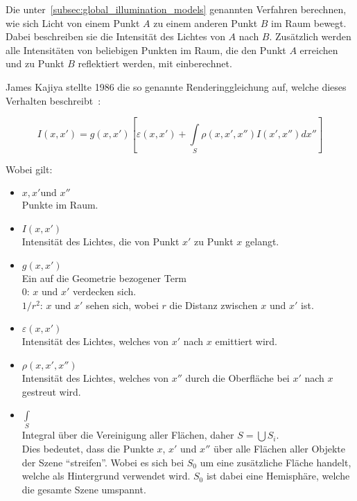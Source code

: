 Die unter~\ref{subsec:global_illumination_models} genannten Verfahren
berechnen, wie sich Licht von einem Punkt $A$ zu einem anderen Punkt $B$
im Raum bewegt. Dabei beschreiben sie die Intensität des Lichtes von $A$
nach $B$. Zusätzlich werden alle Intensitäten von beliebigen Punkten im
Raum, die den Punkt $A$ erreichen und zu Punkt $B$ reflektiert werden,
mit einberechnet.

James Kajiya stellte 1986 die so genannte Renderinggleichung auf, welche
dieses Verhalten
beschreibt~\parencites{kajiya_rendering_1986}{foley_computer_1996}:

\begin{equation}
    I(x, x') = g(x, x')[\varepsilon(x, x') + \int\limits_{S}\rho(x, x', x'')I(x', x'')dx'']
\end{equation}

Wobei gilt:

\begin{itemize}
    \item $x, x' \text{und } x''$\\
        Punkte im Raum.
    \item $ I(x, x')$\\
        Intensität des Lichtes, die von Punkt $x'$ zu Punkt $x$ gelangt.
    \item $ g(x, x')$\\
        Ein auf die Geometrie bezogener Term\\
        \hspace*{4mm} $0$:     \hspace*{6mm} $x$ und $x'$ verdecken
                               sich.\\
        \hspace*{4mm} $1/r^2$: \hspace*{1mm} $x$ und $x'$ sehen sich,
                               wobei $r$ die Distanz zwischen $x$ und
                               $x'$ ist.
    \item $\varepsilon(x, x')$\\
        Intensität des Lichtes, welches von $x'$ nach $x$ emittiert
        wird.
    \item $\rho(x, x', x'')$\\
        Intensität des Lichtes, welches von $x''$
        durch die Oberfläche bei $x'$ nach $x$
        gestreut wird.
    \item $\int\limits_{S}$\\
        Integral über die Vereinigung aller Flächen, daher $ S =
        \bigcup{S_{i}} $.\\ Dies bedeutet, dass die Punkte $x$, $x'$ und
        $x''$ über alle Flächen aller Objekte der Szene ``streifen''.
        Wobei es sich bei $S_{0}$ um eine zusätzliche Fläche handelt,
        welche als Hintergrund verwendet wird.  $S_{0}$ ist dabei eine
        Hemisphäre, welche die gesamte Szene umspannt.
\end{itemize}

